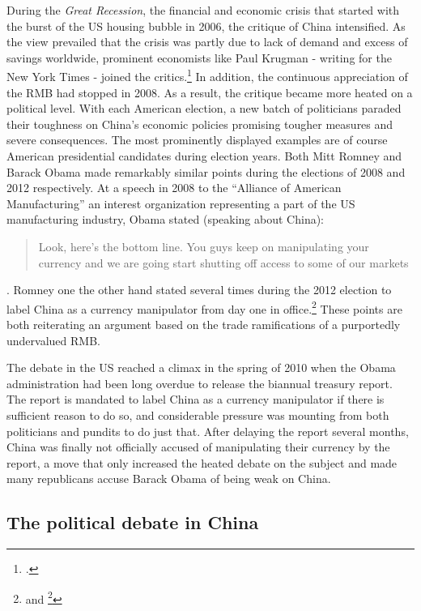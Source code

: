 During the \emph{Great Recession}, the financial and economic crisis that started with the burst of the US housing bubble in 2006, the critique of China intensified. As the view prevailed that the crisis was partly due to lack of demand and excess of savings worldwide, prominent economists like Paul Krugman - writing for the New York Times - joined the critics.\footnote{\cite{Krugman2009}.} In addition, the continuous appreciation of the RMB had stopped in 2008. As a result, the critique became more heated on a political level. With each American election, a new batch of politicians paraded their 
toughness on China's economic policies promising tougher measures and 
severe consequences. The most prominently displayed examples are of 
course American presidential candidates during election years.  Both 
Mitt Romney and Barack Obama made remarkably similar points during the 
elections of 2008 and 2012 respectively. At a speech in 2008 to the 
``Alliance of American Manufacturing'' an interest organization 
representing a part of the US manufacturing industry, Obama stated 
(speaking about China): \begin{quotation}Look, here's the bottom line.  
	You guys keep on manipulating your currency and we are going start 
	shutting off access to some of our markets
\end{quotation}.  Romney one the other hand stated several times during 
the 2012 election to label China as a currency manipulator from day one 
in office.\footnote{\cite{Obama2008} and \footnote{\cite{Romney2012}.}} 
These points are both reiterating an argument based on the trade 
ramifications of a purportedly undervalued RMB.

The debate in the US reached a climax in the spring of 2010 when the 
Obama administration had been long overdue to release the biannual 
treasury report. The report is mandated to label China as a currency 
manipulator if there is sufficient reason to do so, and considerable 
pressure was mounting from both politicians and pundits to do just that.  
After delaying the report several months, China was finally not 
officially accused of manipulating their currency by the report, a move 
that only increased the heated debate on the subject and made many 
republicans accuse Barack Obama of being weak on China.

\subsection{The political debate in China}

